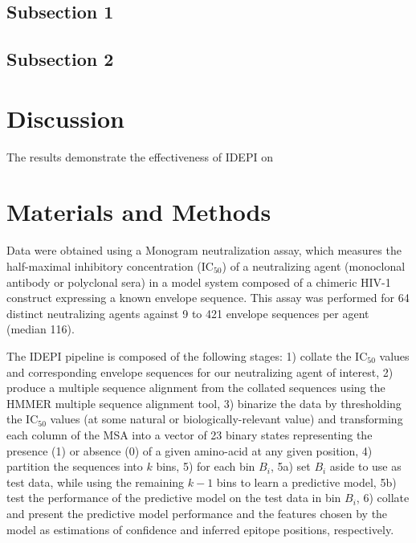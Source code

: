 \documentclass[10pt]{article}
\newcommand{\hmic}{{IC}$_{50}$}
\newcommand{\idepi}{{IDEPI}}
\newcommand{\hiv}{{HIV}-1}
\begin{document}
\subsection*{Subsection 1}

\subsection*{Subsection 2}

\section*{Discussion}

The results demonstrate the effectiveness of \idepi{} on 

\section*{Materials and Methods}
Data were obtained using a Monogram neutralization assay,
which measures the half-maximal inhibitory concentration (\hmic{})
of a neutralizing agent (monoclonal antibody or polyclonal sera) in a model system composed of a chimeric \hiv{} construct expressing a known envelope sequence.
This assay was performed for 64 distinct neutralizing agents against 9 to 421 envelope sequences per agent (median 116).

The \idepi{} pipeline is composed of the following stages:
1) collate the \hmic{} values and corresponding envelope sequences for our neutralizing agent of interest,
2) produce a multiple sequence alignment from the collated sequences using the {HMMER} multiple sequence alignment tool,
3) binarize the data by thresholding the \hmic{} values (at some natural or biologically-relevant value)
and transforming each column of the MSA into a vector of 23 binary states representing the presence (1) or absence (0) of a given amino-acid at any given position,
4) partition the sequences into $k$ bins,
5) for each bin $B_i$,
5a) set $B_i$ aside to use as test data,
while using the remaining $k-1$ bins to learn a predictive model,
5b) test the performance of the predictive model on the test data in bin $B_i$,
6) collate and present the predictive model performance and the features chosen by the model as estimations of confidence and inferred epitope positions, respectively.

\end{document}
